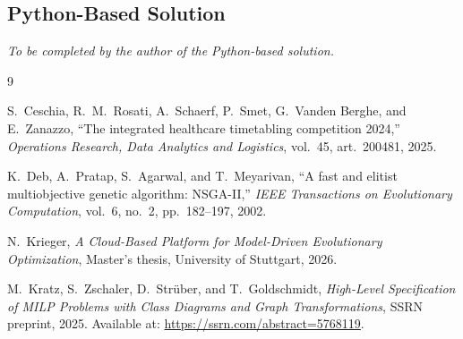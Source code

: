 \documentclass[11pt,a4paper]{article}
\begin{document}
\subsection{Python-Based Solution}

\textit{To be completed by the author of the Python-based solution.}

\begin{thebibliography}{9}

S.~Ceschia, R.~M.~Rosati, A.~Schaerf, P.~Smet, G.~Vanden Berghe, and E.~Zanazzo,
``The integrated healthcare timetabling competition 2024,''
\textit{Operations Research, Data Analytics and Logistics}, vol.~45, art.~200481, 2025.

K.~Deb, A.~Pratap, S.~Agarwal, and T.~Meyarivan,
``A fast and elitist multiobjective genetic algorithm: NSGA-II,''
\textit{IEEE Transactions on Evolutionary Computation}, vol.~6, no.~2, pp.~182--197, 2002.

N.~Krieger,
\textit{A Cloud-Based Platform for Model-Driven Evolutionary Optimization},
Master's thesis, University of Stuttgart, 2026.

M.~Kratz, S.~Zschaler, D.~Str\"uber, and T.~Goldschmidt,
\textit{High-Level Specification of MILP Problems with Class Diagrams and Graph Transformations},
SSRN preprint, 2025. Available at: \url{https://ssrn.com/abstract=5768119}.

\end{thebibliography}
\end{document}
